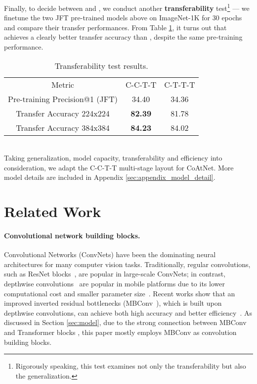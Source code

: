 \documentclass{article}
\newcommand{\name}{CoAtNet\xspace}
\begin{document}
Finally, to decide between  and , we conduct another \textbf{transferability} test\footnote{Rigorously speaking, this test examines not only the transferability but also the generalization.} --- we finetune the two JFT pre-trained models above on ImageNet-1K for 30 epochs and compare their transfer performances.
From Table \ref{tab:transfer}, it turns out that  achieves a clearly better transfer accuracy than , despite the same pre-training performance.
\begin{table}[!ht]
    \centering
    \vspace{-1em}
    \caption{Transferability test results.}
    \begin{tabular}{c|cc}
    \toprule
        Metric & \textsc{C-C-T-T} & \textsc{C-T-T-T} \\
        \cmidrule(r){1-1}\cmidrule(l){2-3}  
        Pre-training Precision@1 (JFT) & 34.40 & 34.36 \\
        Transfer Accuracy 224x224  & \bf 82.39 & 81.78 \\
        Transfer Accuracy 384x384  & \bf 84.23 & 84.02 \\
    \bottomrule
    \end{tabular}
    \label{tab:transfer}
\end{table}
\\
Taking generalization, model capacity, transferability and efficiency into consideration, we adapt the \textsc{C-C-T-T} multi-stage layout for \name.
More model details are included in Appendix \ref{sec:appendix_model_detail}.

\section{Related Work}
\label{sec:related}

\paragraph{Convolutional network building blocks.} Convolutional Networks (ConvNets) have been the dominating neural architectures for many computer vision tasks. Traditionally, regular convolutions, such as ResNet blocks~\cite{he2016deep}, are popular in large-scale ConvNets; in contrast, depthwise convolutions~\cite{sepconv14} are popular in mobile platforms due to its lower computational cost and smaller parameter size~\cite{sandler2018mobilenetv2}. Recent works show that an improved inverted residual bottlenecks (MBConv~\cite{sandler2018mobilenetv2,tan2019mnasnet}), which is built upon depthwise convolutions, can achieve both high accuracy and better efficiency~\cite{efficientnet19,tan2021efficientnetv2}.
As discussed in Section \ref{sec:model}, due to the strong connection between MBConv and Transformer blocks , this paper mostly employs MBConv as convolution building blocks.
\end{document}
